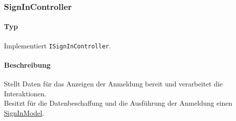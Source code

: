 \subsubsection{SignInController}\label{App_Signup_SignInController}
\paragraph*{Typ}
Implementiert \texttt{ISignInController}.
\paragraph*{Beschreibung}
Stellt Daten für das Anzeigen der Anmeldung bereit und verarbeitet die Interaktionen.\\
Besitzt für die Datenbeschaffung und die Ausführung der Anmeldung einen \hyperref[App_Signup_SignInModel]{SignInModel}.
